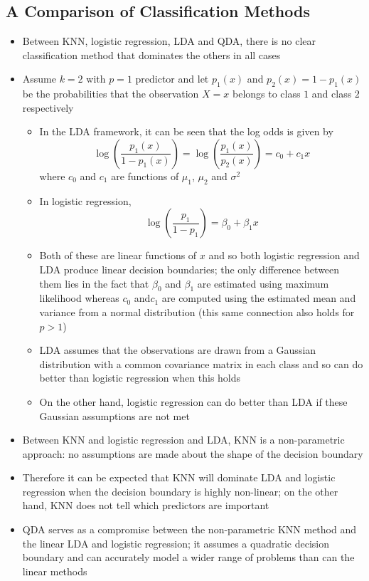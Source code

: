 \documentclass[12pt]{article}
\begin{document}
\subsection{A Comparison of Classification Methods} 
\begin{itemize} 
\item Between KNN, logistic regression, LDA and QDA, there is no clear classification method that dominates the others in all cases 
\item Assume $k=2$ with $p=1$ predictor and let $p_1(x)$ and $p_2(x) = 1-p_1(x)$ be the probabilities that the observation $X=x$ belongs to class $1$ and class $2$ respectively \begin{itemize} 
\item In the LDA framework, it can be seen that the log odds is given by $$ \log \left( \frac{p_1(x)}{1-p_1(x)} \right) = \log \left( \frac{p_1(x)}{p_2(x)}\right) = c_0 + c_1x $$ where $c_0$ and $c_1$ are functions of $\mu_1$, $\mu_2$ and $\sigma^2$ 
\item In logistic regression, $$ \log \left( \frac{p_1}{1-p_1} \right) = \beta_0 + \beta_1x$$ 
\item Both of these are linear functions of $x$ and so both logistic regression and LDA produce linear decision boundaries; the only difference between them lies in the fact that $\beta_0$ and $\beta_1$ are estimated using maximum likelihood whereas $c_0$ and$c_1$ are computed using the estimated mean and variance from a normal distribution (this same connection also holds for $p>1$) 
\item LDA assumes that the observations are drawn from a Gaussian distribution with a common covariance matrix in each class and so can do better than logistic regression when this holds
\item On the other hand, logistic regression can do better than LDA if these Gaussian assumptions are not met \end{itemize} 
\item Between KNN and logistic regression and LDA, KNN is a non-parametric approach: no assumptions are made about the shape of the decision boundary
\item Therefore it can be expected that KNN will dominate LDA and logistic regression when the decision boundary is highly non-linear; on the other hand, KNN does not tell which predictors are important 
\item QDA serves as a compromise between the non-parametric KNN method and the linear LDA and logistic regression; it assumes a quadratic decision boundary and can accurately model a wider range of problems than can the linear methods

\end{itemize}
\end{document}
